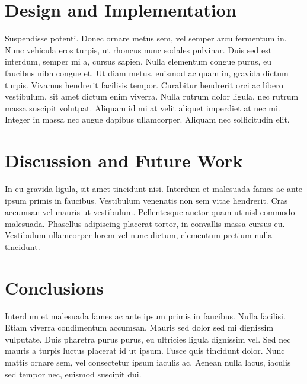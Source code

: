 \documentclass{acm_proc_article-sp}
\begin{document}
\section{Design and Implementation}
Suspendisse potenti. Donec ornare metus sem, vel semper arcu fermentum in. Nunc
vehicula eros turpis, ut rhoncus nunc sodales pulvinar. Duis sed est interdum,
semper mi a, cursus sapien. Nulla elementum congue purus, eu faucibus nibh
congue et. Ut diam metus, euismod ac quam in, gravida dictum turpis. Vivamus
hendrerit facilisis tempor. Curabitur hendrerit orci ac libero vestibulum, sit
amet dictum enim viverra. Nulla rutrum dolor ligula, nec rutrum massa suscipit
volutpat. Aliquam id mi at velit aliquet imperdiet at nec mi. Integer in massa
nec augue dapibus ullamcorper. Aliquam nec sollicitudin elit.

\section{Discussion and Future Work}
In eu gravida ligula, sit amet tincidunt nisi. Interdum et malesuada fames ac
ante ipsum primis in faucibus.  Vestibulum venenatis non sem vitae hendrerit.
Cras accumsan vel mauris ut vestibulum. Pellentesque auctor quam ut nisl
commodo malesuada. Phasellus adipiscing placerat tortor, in convallis massa
cursus eu. Vestibulum ullamcorper lorem vel nunc dictum, elementum pretium
nulla tincidunt.

\section{Conclusions}

Interdum et malesuada fames ac ante ipsum primis in faucibus. Nulla facilisi.
Etiam viverra condimentum accumsan. Mauris sed dolor sed mi dignissim
vulputate. Duis \cite{clark:pct }pharetra purus purus, eu ultricies ligula dignissim vel. Sed
nec mauris a turpis luctus placerat id ut ipsum. Fusce quis tincidunt dolor.
Nunc mattis ornare sem, vel consectetur ipsum iaculis ac. Aenean nulla lacus,
iaculis sed tempor nec, euismod suscipit dui.




\end{document}
